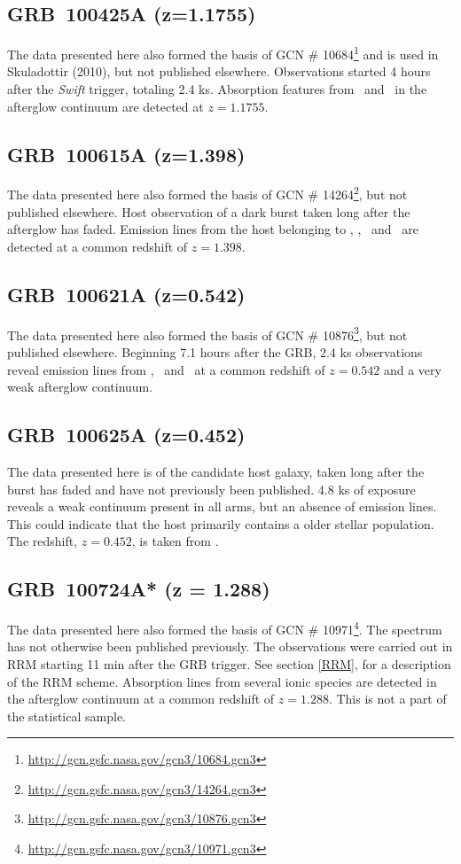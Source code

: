 \documentclass{aa}    %
\begin{document}
\subsection{GRB~100425A (z=1.1755)}
The data presented here also formed the basis of GCN \#
10684\footnote{\url{http://gcn.gsfc.nasa.gov/gcn3/10684.gcn3}} and is used in
Skuladottir (2010), but not published elsewhere. Observations started 4
hours after the \textit{Swift} trigger, totaling 2.4 ks. Absorption features
from \mgii~and \feii~in the afterglow continuum are detected at $z=1.1755$.

\subsection{GRB~100615A (z=1.398)}
The data presented here also formed the basis of GCN \#
14264\footnote{\url{http://gcn.gsfc.nasa.gov/gcn3/14264.gcn3}}, but not
published elsewhere. Host observation of a dark burst\citep{DElia2011} taken
long after the afterglow has faded. Emission lines from the host belonging to
\oii, \neiii, \oiii~and \ha~are detected at a common redshift of $z=1.398$.

\subsection{GRB~100621A (z=0.542)}
The data presented here also formed the basis of GCN \#
10876\footnote{\url{http://gcn.gsfc.nasa.gov/gcn3/10876.gcn3}}, but not
published elsewhere. Beginning 7.1 hours after the GRB, 2.4 ks observations
reveal emission lines from \oii, \hb~and \oiii~at a common redshift of
$z=0.542$ and a very weak afterglow continuum.

\subsection{GRB~100625A (z=0.452)}
The data presented here is of the candidate host galaxy, taken long after the
burst has faded and have not previously been published. 4.8 ks of exposure
reveals a weak continuum present in all arms, but an absence of emission lines.
This could indicate that the host primarily contains a older stellar
population. The redshift, $z=0.452$, is taken from \citet{Fong2013}.


\subsection{GRB~100724A* (z = 1.288)}

The data presented here also formed the basis of GCN \#
10971\footnote{\url{http://gcn.gsfc.nasa.gov/gcn3/10971.gcn3}}. The spectrum has
not otherwise been published previously. The observations were carried out in
RRM starting 11 min after the GRB trigger. See section \ref{RRM}, for a
description of the RRM scheme. Absorption lines from several ionic species are
detected in the afterglow continuum at a common redshift of $z = 1.288$. This is
not a part of the statistical sample.
\end{document}

